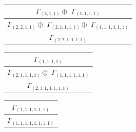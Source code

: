 \documentclass[main.tex]{subfiles}
\begin{document}
\begin{minipage}{.33\textwidth}
\centering
\begin{tabular}{c}
$\Gamma_{(
2 , 
1 , 
1
)} \oplus$
$\Gamma_{(
1 , 
1 , 
1 , 
1
)}$
\\ \hline
$\Gamma_{(
2 , 
2 , 
1 , 
1
)} \oplus$
$\Gamma_{(
2 , 
1 , 
1 , 
1 , 
1
)} \oplus$
$\Gamma_{(
1 , 
1 , 
1 , 
1 , 
1 , 
1
)}$
\\ \hline
$\Gamma_{(
2 , 
2 , 
1 , 
1 , 
1 , 
1
)}$
\\
\end{tabular}\end{minipage}
\begin{minipage}{.33\textwidth}
\centering
\begin{tabular}{c}
$\Gamma_{(
1 , 
1 , 
1 , 
1
)}$
\\ \hline
$\Gamma_{(
2 , 
1 , 
1 , 
1 , 
1
)} \oplus$
$\Gamma_{(
1 , 
1 , 
1 , 
1 , 
1 , 
1
)}$
\\ \hline
$\Gamma_{(
2 , 
1 , 
1 , 
1 , 
1 , 
1 , 
1
)}$
\\
\end{tabular}\end{minipage}
\bigskip
\begin{minipage}{.25\textwidth}
\centering
\begin{tabular}{c}
$\Gamma_{(
1 , 
1 , 
1 , 
1 , 
1 , 
1
)}$
\\ \hline
$\Gamma_{(
1 , 
1 , 
1 , 
1 , 
1 , 
1 , 
1 , 
1
)}$
\\
\end{tabular}\end{minipage}
\end{document}
